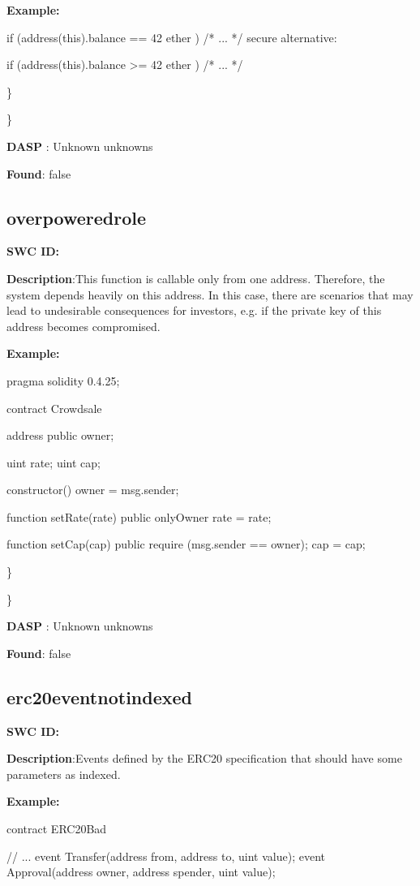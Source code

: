 \documentclass{article}
\begin{document}
{\textbf{Example:} 

if (address(this).balance == 42 ether ) {
    /* ... */
}
 secure alternative:

if (address(this).balance >= 42 ether ) {
  /* ... */
}

\} 

\} 

\textbf{DASP} : Unknown unknowns

\textbf{Found}: false

\subsection{overpowered\textunderscore role} 
\textbf{SWC \textunderscore ID:} 

\textbf{Description}:This function is callable only from one address. Therefore, the system depends heavily on this address. In this case, there are scenarios that may lead to undesirable consequences for investors, e.g. if the private key of this address becomes compromised.


\textbf{Example:} 

pragma solidity 0.4.25;

contract Crowdsale {

    address public owner;

    uint rate;
    uint cap;

    constructor() {
        owner = msg.sender;
    }

    function setRate(\textunderscore rate) public onlyOwner {
        rate = \textunderscore rate;
    }

    function setCap(\textunderscore cap) public {
        require (msg.sender == owner);
        cap = \textunderscore cap;
    }
}

\} 

\} 

\textbf{DASP} : Unknown unknowns

\textbf{Found}: false

\subsection{erc20\textunderscore event\textunderscore not\textunderscore indexed} 
\textbf{SWC \textunderscore ID:} 

\textbf{Description}:Events defined by the ERC20 specification that should have some parameters as indexed.


\textbf{Example:} 

contract ERC20Bad {
    // ...
    event Transfer(address from, address to, uint value);
    event Approval(address owner, address spender, uint value);

}}
\end{document}
